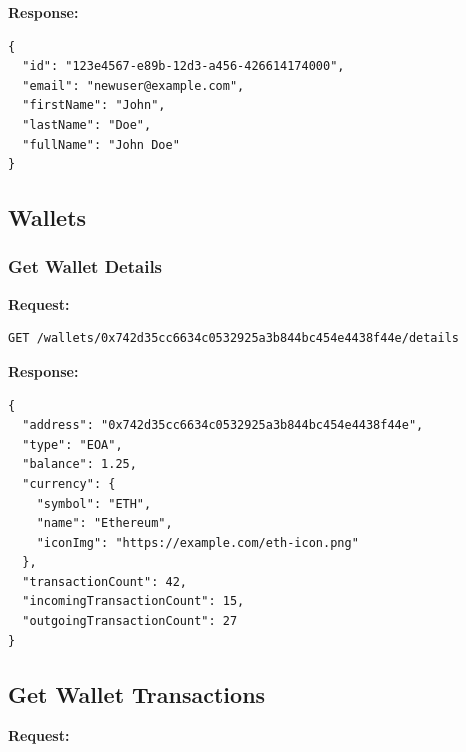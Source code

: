 \vspace{1em}
\textbf{Response:}

\begin{tcolorbox}[width=\textwidth, boxrule=0.5pt, colback=gray!5, colframe=gray!50]
\begin{verbatim}
{
  "id": "123e4567-e89b-12d3-a456-426614174000",
  "email": "newuser@example.com",
  "firstName": "John",
  "lastName": "Doe",
  "fullName": "John Doe"
}
\end{verbatim}
\end{tcolorbox}

\subsection*{Wallets}

\subsubsection*{Get Wallet Details}

\textbf{Request:}

\begin{tcolorbox}[width=\textwidth, boxrule=0.5pt, colback=gray!5, colframe=gray!50]
\begin{verbatim}
GET /wallets/0x742d35cc6634c0532925a3b844bc454e4438f44e/details
\end{verbatim}
\end{tcolorbox}

\vspace{1em}
\textbf{Response:}

\begin{tcolorbox}[width=\textwidth, boxrule=0.5pt, colback=gray!5, colframe=gray!50]
\begin{verbatim}
{
  "address": "0x742d35cc6634c0532925a3b844bc454e4438f44e",
  "type": "EOA",
  "balance": 1.25,
  "currency": {
    "symbol": "ETH",
    "name": "Ethereum",
    "iconImg": "https://example.com/eth-icon.png"
  },
  "transactionCount": 42,
  "incomingTransactionCount": 15,
  "outgoingTransactionCount": 27
}
\end{verbatim}
\end{tcolorbox}

\subsection*{Get Wallet Transactions}

\textbf{Request:}

